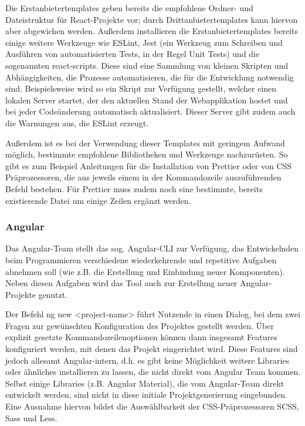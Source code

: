 Die Erstanbietertemplates geben bereits die empfohlene Ordner- und Dateistruktur für React-Projekte vor; durch Drittanbietertemplates kann hiervon aber abgewichen werden. Außerdem installieren die Erstanbietertemplates bereits einige weitere Werkzeuge wie ESLint, Jest (ein Werkzeug zum Schreiben und Ausführen von automatisierten Tests, in der Regel Unit Tests) und die sogenannten react-scripts. Diese sind eine Sammlung von kleinen Skripten und Abhängigkeiten, die Prozesse automatisieren, die für die Entwicklung notwendig sind. Beispielsweise wird so ein Skript zur Verfügung gestellt, welcher einen lokalen Server startet, der den aktuellen Stand der Webapplikation hostet und bei jeder Codeänderung automatisch aktualisiert. Dieser Server gibt zudem auch die Warnungen aus, die ESLint erzeugt.

Außerdem ist es bei der Verwendung dieser Templates mit geringem Aufwand möglich, bestimmte empfohlene Bibliotheken und Werkzeuge nachzurüsten. So gibt es zum Beispiel Anleitungen für die Installation von Prettier oder von CSS Präprozessoren, die aus jeweils einem in der Kommandozeile auszuführenden Befehl bestehen. Für Prettier muss zudem noch eine bestimmte, bereits existierende Datei um einige Zeilen ergänzt werden.

\subsubsection{Angular}
Das Angular-Team stellt das sog. Angular-\gls{CLI} zur Verfügung, das Entwickelnden beim Programmieren verschiedene wiederkehrende und repetitive Aufgaben abnehmen soll (wie z.B. die Erstellung und Einbindung neuer Komponenten). Neben diesen Aufgaben wird das Tool auch zur Erstellung neuer Angular-Projekte genutzt.

Der Befehl ng new <project-name> führt Nutzende in einen Dialog, bei dem zwei Fragen zur gewünschten Konfiguration des Projektes gestellt werden. Über explizit gesetzte Kommandozeilenoptionen können dann insgesamt Features konfiguriert werden, mit denen das Projekt eingerichtet wird. Diese Features sind jedoch allesamt Angular-intern, d.h. es gibt keine Möglichkeit weitere Libraries oder ähnliches installieren zu lassen, die nicht direkt vom Angular Team kommen. Selbst einige Libraries (z.B. Angular Material), die vom Angular-Team direkt entwickelt werden, sind nicht in diese initiale Projektgenerierung eingebunden. Eine Ausnahme hiervon bildet die Auswählbarkeit der CSS-Präprozessoren SCSS, Sass und Less.

